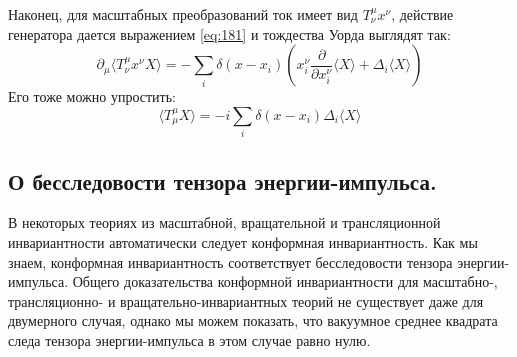 \documentclass[a4paper,12pt]{article}
\theoremstyle{definition}
\theoremstyle{definition}
\theoremstyle{definition}
\begin{document}
Наконец, для масштабных преобразований ток имеет вид $T^{\mu}_{\nu}x^{\nu}$, действие генератора
дается выражением \eqref{eq:181} и тождества Уорда выглядят так: 
\begin{equation}
  \label{eq:212}
  \partial_{\mu}\langle T^{\mu}_{\nu} x^{\nu} X\rangle=-\sum_{i} \delta(x-x_{i}) \left( x^{\nu}_{i}\frac{\partial}{\partial x^{\nu}_{i}} \langle X\rangle+\Delta_{i} \langle X\rangle\right) 
\end{equation}
Его тоже можно упростить:
\begin{equation}
  \label{eq:213}
  \langle T^{\mu}_{\mu} X \rangle = -i \sum_{i} \delta(x-x_{i}) \Delta_{i}\langle X\rangle
\end{equation}

\subsection{О бесследовости тензора энергии-импульса.}
\label{sec:tracelessness}

В некоторых теориях из масштабной, вращательной и трансляционной инвариантности автоматически
следует конформная инвариантность. Как мы знаем, конформная инвариантность соответствует
бесследовости тензора энергии-импульса. Общего доказательства конформной инвариантности для
масштабно-, трансляционно- и вращательно-инвариантных теорий не существует даже для двумерного
случая, однако мы можем показать, что вакуумное среднее квадрата следа тензора энергии-импульса в
этом случае равно нулю. 
\end{document}
